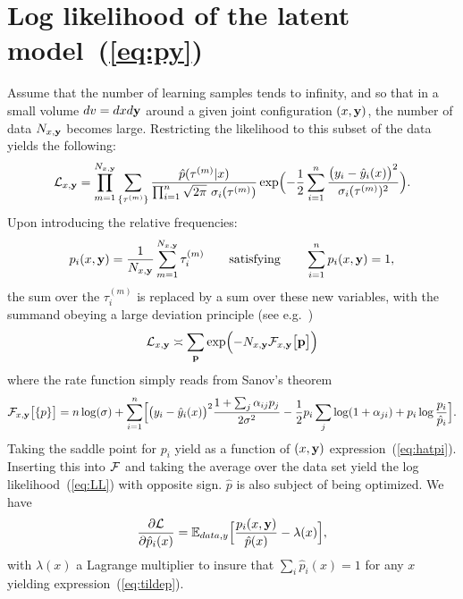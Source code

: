 \chapter{Log likelihood of the latent model~(\ref{eq:py})}\label{app:LL}
Assume that the number of learning samples tends to infinity, and so that in a small volume $dv = dxd{\bf y}$ around a given  joint configuration $(x,{\bf y})$,
the number of data $N_{x,{\bf y}}$ becomes large. Restricting the likelihood to this subset of the data yields the following:
\[
{\cal L}_{x,{\bf y}} = \prod_{m=1}^{N_{x,{\bf y}}} \sum_{\{\tau^{(m)}\}} 
\frac{\hat p(\tau^{(m)}\vert x)}{\prod_{i=1}^n\sqrt{2\pi}\ \sigma_i(\tau^{(m)})}
\exp\Bigl(-\frac{1}{2}\sum_{i=1}^n\frac{\bigl(y_i-\hat y_i(x)\bigr)^2}{\sigma_i(\tau^{(m)})^2}\Bigr).
\]
Upon introducing the relative frequencies:
\[
p_i(x,{\bf y}) = \frac{1}{N_{x,{\bf y}}}\sum_{m=1}^{N_{x,{\bf y}}} \tau_i^{(m)} 
\qquad\text{satisfying}\qquad 
\sum_{i=1}^n p_i(x,{\bf y}) = 1,
\]
the sum over the $\tau_i^{(m)}$ is replaced by a sum over these new variables, 
with the summand obeying a large deviation principle (see e.g.~\citet{Touchette})
\[
{\cal L}_{x,{\bf y}} \asymp \sum_{{\bf p}} 
\exp\Bigl(-N_{x,{\bf y}} {\cal F}_{x,{\bf y}}\bigl[{\bf p}\bigr]\Bigr)
\]
where the rate function simply reads from Sanov's theorem
\[
{\cal F}_{x,{\bf y}}\bigl[\{p\}\bigr] = n\log(\sigma)+
\sum_{i=1}^n\Bigl[\bigl(y_i-\hat y_i(x)\bigr)^2\frac{1+\sum_j\alpha_{ij}p_j}{2\sigma^2}
-\frac{1}{2}p_i\sum_j\log(1+\alpha_{ji})+p_i\log\frac{p_i}{\hat p_i}\Bigr].
\]
Taking the saddle point for $p_i$ yield as a function of $(x,{\bf y})$ expression~(\ref{eq:hatpi}). Inserting this into ${\cal F}$ and taking
the average over the data set yield the log likelihood~(\ref{eq:LL}) with opposite sign. 
$\hat p$ is also subject of being optimized. We have
\[
\frac{\partial{\cal L}}{\partial \hat p_i(x)} = {\mathbb E}_{data,y}\Bigl[\frac{p_i(x,{\bf y})}{\hat p(x)}-\lambda(x)\Bigr],
\]
with $\lambda(x)$ a Lagrange multiplier to insure that $\sum_i\hat p_i(x)=1$ for any $x$ yielding expression~(\ref{eq:tildep}).


